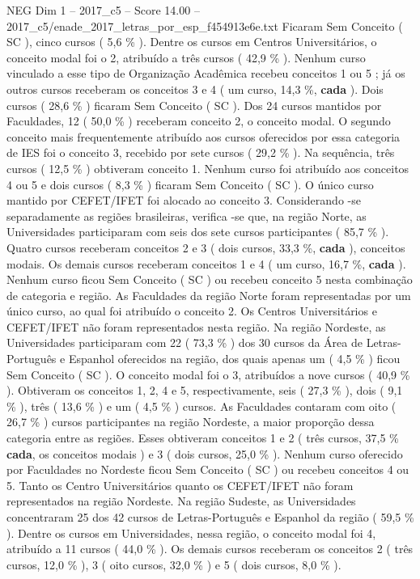 \begin{textsample}{NEG Dim 1 – 2017\_c5 – Score 14.00 – 2017\_c5/enade\_2017\_letras\_por\_esp\_f454913e6e.txt}
Ficaram Sem Conceito ( SC ), cinco cursos ( 5,6 \% ).
Dentre os cursos em Centros Universitários, o conceito modal foi o 2, atribuído a três cursos ( 42,9 \% ).
Nenhum curso vinculado a esse tipo de Organização Acadêmica recebeu conceitos 1 ou 5 ; já os outros cursos receberam os conceitos 3 e 4 ( um curso, 14,3 \%, \textbf{cada} ).
Dois cursos ( 28,6 \% ) ficaram Sem Conceito ( SC ).
Dos 24 cursos mantidos por Faculdades, 12 ( 50,0 \% ) receberam conceito 2, o conceito modal.
O segundo conceito mais frequentemente atribuído aos cursos oferecidos por essa categoria de IES foi o conceito 3, recebido por sete cursos ( 29,2 \% ).
Na sequência, três cursos ( 12,5 \% ) obtiveram conceito 1.
Nenhum curso foi atribuído aos conceitos 4 ou 5 e dois cursos ( 8,3 \% ) ficaram Sem Conceito ( SC ).
O único curso mantido por CEFET/IFET foi alocado ao conceito 3.
Considerando -se separadamente as regiões brasileiras, verifica -se que, na região Norte, as Universidades participaram com seis dos sete cursos participantes ( 85,7 \% ).
Quatro cursos receberam conceitos 2 e 3 ( dois cursos, 33,3 \%, \textbf{cada} ), conceitos modais.
Os demais cursos receberam conceitos 1 e 4 ( um curso, 16,7 \%, \textbf{cada} ).
Nenhum curso ficou Sem Conceito ( SC ) ou recebeu conceito 5 nesta combinação de categoria e região.
As Faculdades da região Norte foram representadas por um único curso, ao qual foi atribuído o conceito 2.
Os Centros Universitários e CEFET/IFET não foram representados nesta região.
Na região Nordeste, as Universidades participaram com 22 ( 73,3 \% ) dos 30 cursos da Área de Letras-Português e Espanhol oferecidos na região, dos quais apenas um ( 4,5 \% ) ficou Sem Conceito ( SC ).
O conceito modal foi o 3, atribuídos a nove cursos ( 40,9 \% ).
Obtiveram os conceitos 1, 2, 4 e 5, respectivamente, seis ( 27,3 \% ), dois ( 9,1 \% ), três ( 13,6 \% ) e um ( 4,5 \% ) cursos.
As Faculdades contaram com oito ( 26,7 \% ) cursos participantes na região Nordeste, a maior proporção dessa categoria entre as regiões.
Esses obtiveram conceitos 1 e 2 ( três cursos, 37,5 \% \textbf{cada}, os conceitos modais ) e 3 ( dois cursos, 25,0 \% ).
Nenhum curso oferecido por Faculdades no Nordeste ficou Sem Conceito ( SC ) ou recebeu conceitos 4 ou 5.
Tanto os Centro Universitários quanto os CEFET/IFET não foram representados na região Nordeste.
Na região Sudeste, as Universidades concentraram 25 dos 42 cursos de Letras-Português e Espanhol da região ( 59,5 \% ).
Dentre os cursos em Universidades, nessa região, o conceito modal foi 4, atribuído a 11 cursos ( 44,0 \% ).
Os demais cursos receberam os conceitos 2 ( três cursos, 12,0 \% ), 3 ( oito cursos, 32,0 \% ) e 5 ( dois cursos, 8,0 \% ).

\end{textsample}
